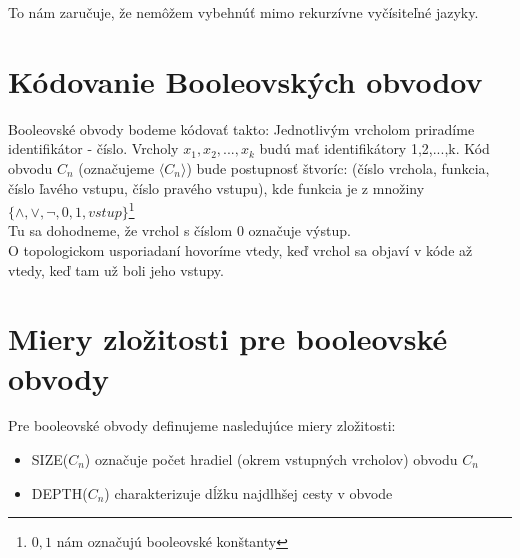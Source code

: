 To nám zaručuje, že nemôžem vybehnúť mimo rekurzívne vyčísiteľné jazyky.

\section{Kódovanie Booleovských obvodov}

Booleovské obvody bodeme kódovať takto: Jednotlivým vrcholom priradíme identifikátor -
číslo. Vrcholy $x_1,x_2,...,x_k$ budú mať identifikátory 1,2,...,k. Kód obvodu $C_n$
(označujeme $\langle C_n \rangle$) bude postupnosť štvoríc: (číslo vrchola, funkcia,
číslo ľavého vstupu, číslo pravého vstupu), kde funkcia je z množiny $\{\wedge , \vee ,
\neg , 0 , 1 , vstup \}$\footnote{$0,1$ nám označujú booleovské konštanty}\\ Tu sa
dohodneme, že vrchol s číslom 0 označuje výstup.\\ O topologickom usporiadaní hovoríme
vtedy, keď vrchol sa objaví v kóde až vtedy, keď tam už boli jeho vstupy.

\section{Miery zložitosti pre booleovské obvody}

Pre booleovské obvody definujeme nasledujúce miery zložitosti:
\begin{itemize}
\item{SIZE($C_n$) }označuje počet hradiel (okrem vstupných vrcholov) obvodu $C_n$
\item{DEPTH($C_n$) }charakterizuje dĺžku najdlhšej cesty v obvode
\end{itemize}

